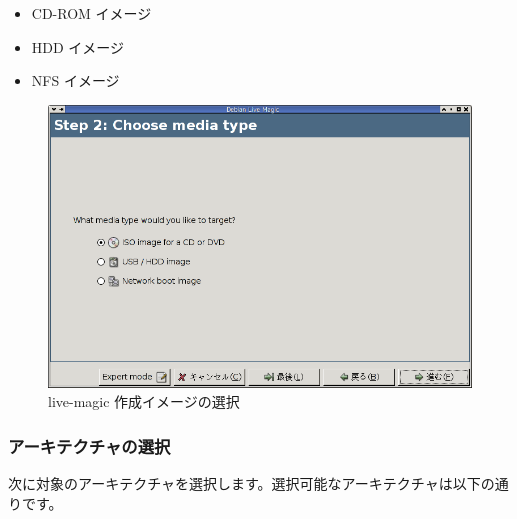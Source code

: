 \documentclass[mingoth,a4paper]{jsarticle}
\begin{document}
\begin{multicols}{2}
 \begin{itemize}
 \item CD-ROM イメージ
 \item HDD イメージ
 \item NFS イメージ 
 \end{itemize}

 \begin{figure}[H]
 \begin{center}
  \includegraphics[width=1\hsize]{image200711/live-magic02.png}
 \end{center}
 \caption{live-magic 作成イメージの選択}
 \label{live-magic02}
 \end{figure}
\end{multicols}

\subsubsection{アーキテクチャの選択}
次に対象のアーキテクチャを選択します。選択可能なアーキテクチャは以下の通りです。
\end{document}
